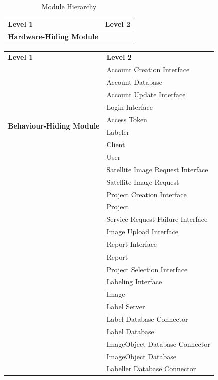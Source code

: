 \documentclass[12pt, titlepage]{article}
\begin{document}
  






\newpage 
\begin{table}[h!]
  \centering
  \begin{tabular}{p{} p{}}
  \toprule
  \textbf{Level 1} & \textbf{Level 2}\\
  \midrule
  
  \textbf{Hardware-Hiding Module} & ~ \\
  \midrule
\end{tabular}
\caption{Module Hierarchy}
\label{TblMH}
\end{table}
\begin{table}[h!]
  \centering
  \begin{tabular}{p{} p{}}
  \toprule
  \textbf{Level 1} & \textbf{Level 2}\\
  \multirow{10}{0.3\textwidth}{\textbf{Behaviour-Hiding Module}} 
   & Account Creation Interface\\
   & Account Database\\
   & Account Update Interface\\
   & Login Interface\\
   & Access Token\\
   & Labeler\\
   & Client\\
   & User\\
   & Satellite Image Request Interface\\
   & Satellite Image Request\\
   & Project Creation Interface\\
   & Project\\
   & Service Request Failure Interface\\
   & Image Upload Interface\\
   & Report Interface\\
   & Report\\
   & Project Selection Interface\\
   & Labeling Interface\\
   & Image\\
   & Label Server\\
   & Label Database Connector\\
   & Label Database\\
   & ImageObject Database Connector\\
   & ImageObject Database\\
   & Labeller Database Connector\\

\end{tabular}
\end{table}
\end{document}
